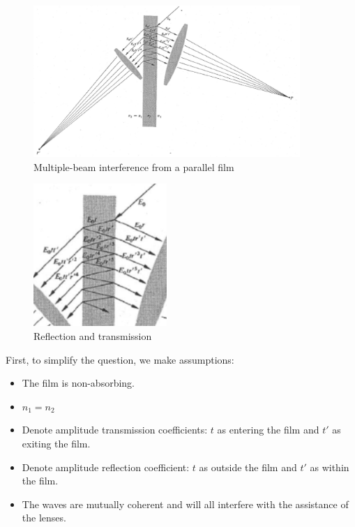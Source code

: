 \documentclass[openany]{book}
\begin{document}
\begin{figure}[htbp]
\vspace{-10pt}
\centering
\label{fig:22}
\includegraphics[width=0.9\textwidth]{Figure/22.PNG}
\caption{Multiple-beam interference from a parallel film}
\end{figure}

\begin{figure}
  \vspace{-20pt}
  \begin{center}
    \includegraphics[width=0.45\textwidth]{Figure/23.PNG}
  \end{center}  
  \vspace{-10pt}
  \caption{Reflection and transmission}
  \vspace{-50pt}
\end{figure}

First, to simplify the question, we make assumptions:
\begin{itemize}
\item The film is non-absorbing.
\item $n_1=n_2$
\item Denote amplitude transmission coefficients: $t$ as entering the film and $t'$ as exiting the film.
\item Denote amplitude reflection coefficient: $t$ as outside the film and $t'$ as within the film.
\item The waves are mutually coherent and will all interfere with the assistance of the lenses.
\end{itemize}
\end{document}
